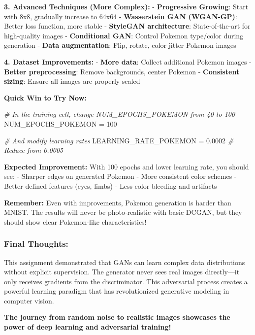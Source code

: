 \documentclass[11pt]{article}
\newenvironment{Shaded}{}{}
\newcommand{\DecValTok}[1]{\textcolor[rgb]{0.25,0.63,0.44}{{#1}}}
\newcommand{\FloatTok}[1]{\textcolor[rgb]{0.25,0.63,0.44}{{#1}}}
\newcommand{\CommentTok}[1]{\textcolor[rgb]{0.38,0.63,0.69}{\textit{{#1}}}}
\newcommand{\NormalTok}[1]{{#1}}
\newcommand{\OperatorTok}[1]{\textcolor[rgb]{0.40,0.40,0.40}{{#1}}}
\begin{document}
\textbf{3. Advanced Techniques (More Complex):} - \textbf{Progressive
Growing}: Start with 8x8, gradually increase to 64x64 -
\textbf{Wasserstein GAN (WGAN-GP)}: Better loss function, more stable -
\textbf{StyleGAN architecture}: State-of-the-art for high-quality images
- \textbf{Conditional GAN}: Control Pokemon type/color during generation
- \textbf{Data augmentation}: Flip, rotate, color jitter Pokemon images

\textbf{4. Dataset Improvements:} - \textbf{More data}: Collect
additional Pokemon images - \textbf{Better preprocessing}: Remove
backgrounds, center Pokemon - \textbf{Consistent sizing}: Ensure all
images are properly scaled

\textbf{Quick Win to Try Now:}

\begin{Shaded}
\begin{Highlighting}[]
\CommentTok{\# In the training cell, change NUM\_EPOCHS\_POKEMON from 40 to 100}
\NormalTok{NUM\_EPOCHS\_POKEMON }\OperatorTok{=} \DecValTok{100}

\CommentTok{\# And modify learning rates}
\NormalTok{LEARNING\_RATE\_POKEMON }\OperatorTok{=} \FloatTok{0.0002}  \CommentTok{\# Reduce from 0.0005}
\end{Highlighting}
\end{Shaded}

\textbf{Expected Improvement:} With 100 epochs and lower learning rate,
you should see: - Sharper edges on generated Pokemon - More consistent
color schemes - Better defined features (eyes, limbs) - Less color
bleeding and artifacts

\textbf{Remember:} Even with improvements, Pokemon generation is harder
than MNIST. The results will never be photo-realistic with basic DCGAN,
but they should show clear Pokemon-like characteristics!

\subsubsection{Final Thoughts:}\label{final-thoughts}

This assignment demonstrated that GANs can learn complex data
distributions without explicit supervision. The generator never sees
real images directly---it only receives gradients from the
discriminator. This adversarial process creates a powerful learning
paradigm that has revolutionized generative modeling in computer vision.

\textbf{The journey from random noise to realistic images showcases the
power of deep learning and adversarial training!}

    


    
    
    
\end{document}
